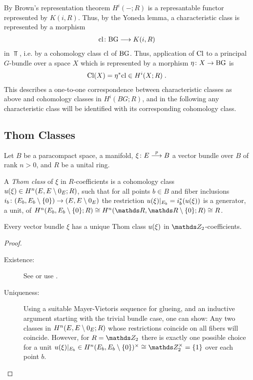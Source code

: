 \begin{Rem}
  By Brown's representation theorem %
  $H^i(-;R)$ is a represantable functor represented by $K(i,R)$.
  Thus, by the Yoneda lemma, a characteristic class is
  represented by a morphism
  \begin{gather*}
    \text{cl}\colon \text{BG} \longrightarrow K(i, R)
  \end{gather*}
  in $\Top$, i.e. by a cohomology class $\text{cl}$ of $\text{BG}$.
  Thus, application of $\text{Cl}$ to a principal $G$-bundle over a
  space $X$ which is represented by a morphism $\eta\colon X\to\text{BG}$ %
  is
  \begin{gather*}
    \text{Cl}(X) = {\eta}^* \text{cl} \in H^i(X;R)
    \;.
  \end{gather*}
  This describes a one-to-one correspondence between
  characteristic classes as above and cohomology classes in
  $H^i(BG;R)$, and in the following any characteristic class will be
  identified with its corresponding cohomology class.
\end{Rem}

\begin{Rem}
\end{Rem}

\subsection{Thom Classes}
Let $B$ be a paracompact space, \forexample a manifold,
$\xi\colon E\overset{p}{\longrightarrow} B$ a vector bundle over $B$ of rank $n>0$,
and $R$ be a unital ring.
\begin{Def}
  A \emph{Thom class} of $\xi$ in $R$-coefficients is a
  cohomology class $u(\xi)\in H^n(E,E\setminus0_{E}; R)$,
  such that for all points $b\in B$ and fiber inclusions
  $i_b\colon (E_b, E_b\setminus\{0\}) \to (E, E\setminus0_{E})$
  the restriction $u(\xi)|_{E_b} = {i}^*_b (u(\xi))$ is a generator,
  \idest a unit, %
  of $H^n(E_b, E_b\setminus\{0\};R)
  \cong H^n(\R, \R\setminus\{0\}; R)
  \cong R$.
\end{Def}
\begin{Thm}
  Every vector bundle $\xi$ has a unique Thom class $u(\xi)$ in
  $\Zmod2$-coefficients.
  \begin{proof}
    \begin{description}
    \item[Existence:] See \cite[Theorem~4D.10]{hatcher} or use
      \cite[Proposition~17.9.3]{tomdieck}.
    \item[Uniqueness:] %
      Using a suitable Mayer-Vietoris sequence for glueing, and an
      inductive argument starting with the trivial bundle case, one can show:
      Any two classes in $H^n(E,E\setminus0_{E};R)$ whose
      restrictions coincide on all fibers will coincide.
      However, for $R=\Zmod2$ there is exactly one possible choice for
      a unit $\u(\xi)|_{E_b}\in
      H^n(E_b,E_b\setminus\{0\})^\times\cong\Zmod2^\times=\{1\}$
      over each point $b$.
    \end{description}
  \end{proof}
\end{Thm}

